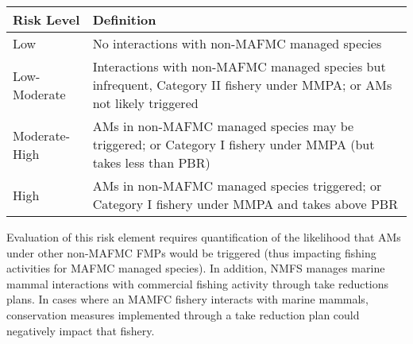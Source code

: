 \documentclass[11pt,]{article}
\begin{document}
\begin{longtable}[]{@{}ll@{}}
\toprule
\begin{minipage}[b]{0.22\columnwidth}\raggedright\strut
Risk Level\strut
\end{minipage} & \begin{minipage}[b]{0.72\columnwidth}\raggedright\strut
Definition\strut
\end{minipage}\tabularnewline
\midrule
\endhead
\begin{minipage}[t]{0.22\columnwidth}\raggedright\strut
Low\strut
\end{minipage} & \begin{minipage}[t]{0.72\columnwidth}\raggedright\strut
No interactions with non-MAFMC managed species\strut
\end{minipage}\tabularnewline
\begin{minipage}[t]{0.22\columnwidth}\raggedright\strut
Low-Moderate\strut
\end{minipage} & \begin{minipage}[t]{0.72\columnwidth}\raggedright\strut
Interactions with non-MAFMC managed species but infrequent, Category II
fishery under MMPA; or AMs not likely triggered\strut
\end{minipage}\tabularnewline
\begin{minipage}[t]{0.22\columnwidth}\raggedright\strut
Moderate-High\strut
\end{minipage} & \begin{minipage}[t]{0.72\columnwidth}\raggedright\strut
AMs in non-MAFMC managed species may be triggered; or Category I fishery
under MMPA (but takes less than PBR)\strut
\end{minipage}\tabularnewline
\begin{minipage}[t]{0.22\columnwidth}\raggedright\strut
High\strut
\end{minipage} & \begin{minipage}[t]{0.72\columnwidth}\raggedright\strut
AMs in non-MAFMC managed species triggered; or Category I fishery under
MMPA and takes above PBR\strut
\end{minipage}\tabularnewline
\bottomrule
\end{longtable}

Evaluation of this risk element requires quantification of the
likelihood that AMs under other non-MAFMC FMPs would be triggered (thus
impacting fishing activities for MAFMC managed species). In addition,
NMFS manages marine mammal interactions with commercial fishing activity
through take reductions plans. In cases where an MAMFC fishery interacts
with marine mammals, conservation measures implemented through a take
reduction plan could negatively impact that fishery.
\end{document}
